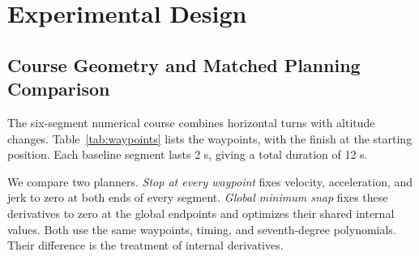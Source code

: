 \documentclass[letterpaper,10pt,conference]{ieeeconf}
\begin{document}
\section{Experimental Design}\label{sec:setup}
\subsection{Course Geometry and Matched Planning Comparison}
The six-segment numerical course combines horizontal turns with altitude changes.
Table~\ref{tab:waypoints} lists the waypoints, with the finish at the starting position.
Each baseline segment lasts 2 s, giving a total duration of 12 s.

We compare two planners.
\emph{Stop at every waypoint} fixes velocity, acceleration, and jerk to zero at both ends of every segment.
\emph{Global minimum snap} fixes these derivatives to zero at the global endpoints and optimizes their shared internal values.
Both use the same waypoints, timing, and seventh-degree polynomials.
Their difference is the treatment of internal derivatives.
\end{document}
